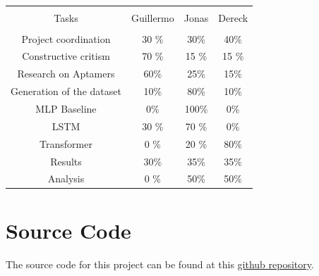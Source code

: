 \documentclass[11pt]{article}
\begin{document}
\begin{table}[H]
    \centering
    \caption{}
    \begin{tabular}{|c|c|c|c|}
    \hline \\
    Tasks & Guillermo & Jonas & Dereck \\
    \hline \\
     Project coordination & 30 \% & 30\% & 40\% \\
     Constructive critism & 70 \% & 15 \% & 15 \% \\
     Research on Aptamers & 60\% & 25\% & 15\% \\
     Generation of the dataset & 10\% & 80\% & 10\% \\
     MLP Baseline & 0\% & 100\% & 0\% \\
     LSTM & 30 \% & 70 \% & 0\% \\
     Transformer & 0 \% & 20 \% & 80\% \\
     Results & 30\% & 35\% & 35\% \\
     Analysis & 0 \% & 50\% & 50\% \\
     \hline
    \end{tabular}
     \label{tab:contrib} 
\end{table}
\section{Source Code}

The source code for this project can be found at this \href{https://github.com/ScierKnave/dna_aptamers_modelling}{github repository}.


\end{document}
